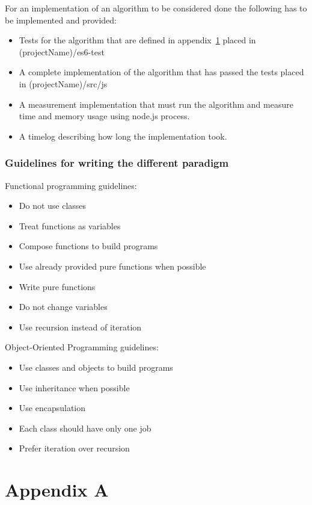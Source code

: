 \documentclass {article}
\begin{document}
For an implementation of an algorithm to be considered done the following has to be implemented and provided:
\begin{itemize}
\item Tests for the algorithm that are defined in appendix~\ref{appendix:test-cases} placed in (projectName)/es6-test
\item A complete implementation of the algorithm that has passed the tests placed in (projectName)/src/js
\item A measurement implementation that must run the algorithm and measure time and memory usage using node.js process. 
\item A timelog describing how long the implementation took. 
\end{itemize}

\subsubsection{Guidelines for writing the different paradigm}
Functional programming guidelines:
\begin{itemize}
\item Do not use classes
\item Treat functions as variables
\item Compose functions to build programs
\item Use already provided pure functions when possible
\item Write pure functions
\item Do not change variables
\item Use recursion instead of iteration
\end{itemize}

Object-Oriented Programming guidelines:
\begin{itemize}
\item Use classes and objects to build programs
\item Use inheritance when possible
\item Use encapsulation
\item Each class should have only one job
\item Prefer iteration over recursion
\end{itemize}
\appendix
\section{Appendix A}
\label{appendix:test-cases}
\end{document}
